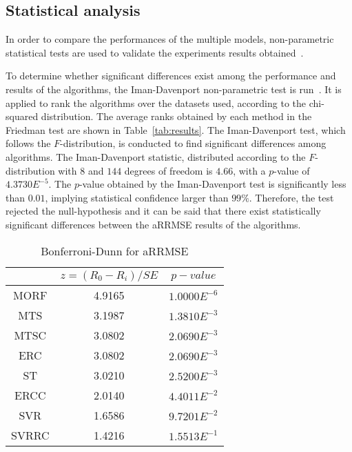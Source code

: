 \documentclass[preprint,12pt]{elsarticle}
\begin{document}
\subsection{Statistical analysis}
In order to compare the performances of the multiple models, non-parametric statistical tests are used to validate the experiments results obtained~\cite{Derrac2011,Garcia20102044}. 

To determine whether significant differences exist among the performance and results of the algorithms, the Iman-Davenport non-parametric test is run~\cite{Garcia2008}. It is applied to rank the algorithms over the datasets used, according to the chi-squared distribution. The average ranks obtained by each method in the Friedman test are shown in Table~\ref{tab:results}. The Iman-Davenport test, which follows the $F$-distribution, is conducted to find significant differences among algorithms. The Iman-Davenport statistic, distributed according to the $F$-distribution with $8$ and $144$ degrees of freedom is $4.66$, with a $p$-value of $4.3730E^{-5}$. The $p$-value obtained by the Iman-Davenport test is significantly less than $0.01$, implying statistical confidence larger than $99\%$. Therefore, the test rejected the null-hypothesis and it can be said that there exist statistically significant differences between the aRRMSE results of the algorithms.

\begin{table}
\renewcommand{\arraystretch}{1.2}
\centering
\caption{Bonferroni-Dunn for aRRMSE}
\begin{tabular}{ccc}
{}&$z=(R_0 - R_i)/SE$&$p-value$ \\
\hline
MORF&4.9165& $1.0000E^{-6}$\\
MTS&3.1987& $1.3810E^{-3}$\\
MTSC&3.0802& $2.0690E^{-3}$\\
ERC&3.0802& $2.0690E^{-3}$\\
ST&3.0210& $2.5200E^{-3}$\\
ERCC&2.0140& $4.4011E^{-2}$\\
SVR&1.6586& $9.7201E^{-2}$\\
SVRRC&1.4216& $1.5513E^{-1}$\\
\hline
\end{tabular}
\label{tab:Bonferroni}
\end{table}
\end{document}
